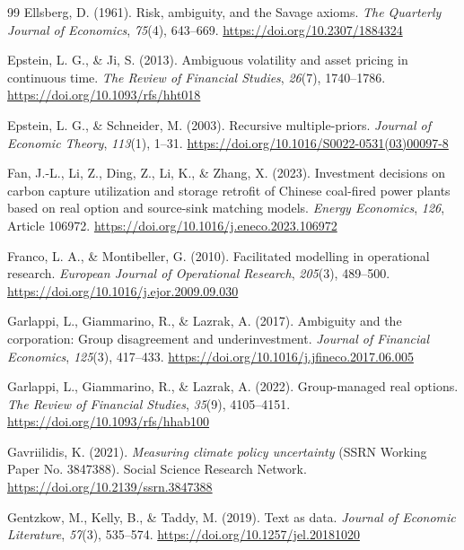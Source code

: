 \begin{thebibliography}{99}
Ellsberg, D. (1961). Risk, ambiguity, and the Savage axioms. \emph{The Quarterly Journal of Economics}, \emph{75}(4), 643--669. \url{https://doi.org/10.2307/1884324}

Epstein, L. G., \& Ji, S. (2013). Ambiguous volatility and asset pricing in continuous time. \emph{The Review of Financial Studies}, \emph{26}(7), 1740--1786. \url{https://doi.org/10.1093/rfs/hht018}

Epstein, L. G., \& Schneider, M. (2003). Recursive multiple-priors. \emph{Journal of Economic Theory}, \emph{113}(1), 1--31. \url{https://doi.org/10.1016/S0022-0531(03)00097-8}

Fan, J.-L., Li, Z., Ding, Z., Li, K., \& Zhang, X. (2023). Investment decisions on carbon capture utilization and storage retrofit of Chinese coal-fired power plants based on real option and source-sink matching models. \emph{Energy Economics}, \emph{126}, Article 106972. \url{https://doi.org/10.1016/j.eneco.2023.106972}

Franco, L. A., \& Montibeller, G. (2010). Facilitated modelling in operational research. \emph{European Journal of Operational Research}, \emph{205}(3), 489--500. \url{https://doi.org/10.1016/j.ejor.2009.09.030}

Garlappi, L., Giammarino, R., \& Lazrak, A. (2017). Ambiguity and the corporation: Group disagreement and underinvestment. \emph{Journal of Financial Economics}, \emph{125}(3), 417--433. \url{https://doi.org/10.1016/j.jfineco.2017.06.005}

Garlappi, L., Giammarino, R., \& Lazrak, A. (2022). Group-managed real options. \emph{The Review of Financial Studies}, \emph{35}(9), 4105--4151. \url{https://doi.org/10.1093/rfs/hhab100}

Gavriilidis, K. (2021). \emph{Measuring climate policy uncertainty} (SSRN Working Paper No. 3847388). Social Science Research Network. \url{https://doi.org/10.2139/ssrn.3847388}

Gentzkow, M., Kelly, B., \& Taddy, M. (2019). Text as data. \emph{Journal of Economic Literature}, \emph{57}(3), 535--574. \url{https://doi.org/10.1257/jel.20181020}


\end{thebibliography}

